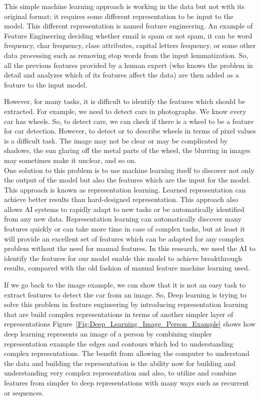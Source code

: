       This simple machine learning approach is working in the data but not with its original format; it requires some different representation to be input to the model. This different representation is named feature engineering. An example of Feature Engineering deciding whether email is spam or not spam, it can be word frequency, char frequency, class attributes, capital letters frequency, or some other data processing such as removing stop words from the input lemmatization. So, all the previous features provided by a human expert (who knows the problem in detail and analyzes which of its features affect the data) are then added as a feature to the input model.
      

      However, for many tasks, it is difficult to identify the features which should be extracted. For example, we need to detect cars in photographs. We know every car has wheels. So, to detect cars, we can check if there is a wheel to be a feature for car detection. However, to detect or to describe wheels in terms of pixel values is a difficult task. The image may not be clear or may be complicated by shadows, the sun glaring off the metal parts of the wheel, the blurring in images may sometimes make it unclear, and so on\cite{Goodfellow-et-al-2016}.\\

      One solution to this problem is to use machine learning itself to discover not only the output of the model but also the features which are the input for the model. This approach is known as representation learning. Learned representation can achieve better results than hard-designed representation. This approach also allows AI systems to rapidly adapt to new tasks or be automatically identified from any new data. Representation learning can automatically discover many features quickly or can take more time in case of complex tasks, but at least it will provide an excellent set of features which can be adapted for any complex problem without the need for manual features. In this research, we used the AI to identify the features for our model enable this model to achieve breakthrough results, compared with the old fashion of manual feature machine learning used.

      If we go back to the image example, we can show that it is not an easy task to extract features to detect the car from an image. So, Deep learning is trying to solve this problem in feature engineering by introducing representation learning that are build complex representations in terms of another simpler layer of representations Figure~\ref{Fig:Deep_Learning_Image_Person_Example} shows how deep learning represents an image of a person by combining simpler representation example the edges and contours which led to understanding complex representations. The benefit from allowing the computer to understand the data and building the representation is the ability now for building and understanding very complex representation and also, to utilize and combine features from simpler to deep representations with many ways such as recurrent or sequences.

